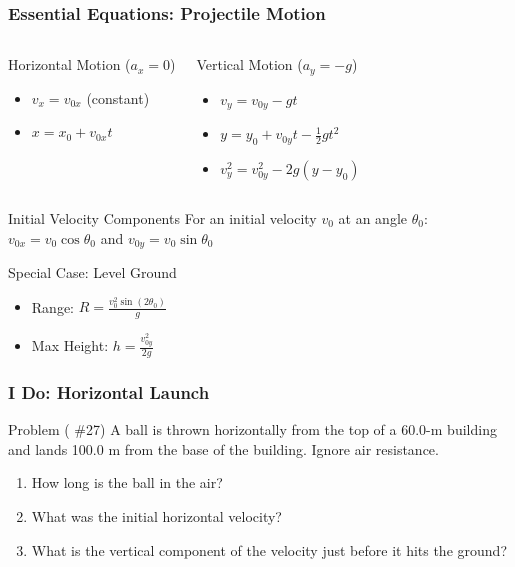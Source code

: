 \documentclass{beamer}
\begin{document}
\begin{frame}[fragile]
\frametitle{Essential Equations: Projectile Motion}
\begin{columns}
\begin{block}{Horizontal Motion ($a_x = 0$)}
\begin{itemize}
    \item $v_x = v_{0x}$ (constant)
    \item $x = x_0 + v_{0x}t$
\end{itemize}
\end{block}
\begin{block}{Vertical Motion ($a_y = -g$)}
\begin{itemize}
    \item $v_y = v_{0y} - gt$
    \item $y = y_0 + v_{0y}t - \frac{1}{2}gt^2$
    \item $v_y^2 = v_{0y}^2 - 2g(y - y_0)$
\end{itemize}
\end{block}
\end{columns}
\pause
\begin{block}{Initial Velocity Components}
For an initial velocity $v_0$ at an angle $\theta_0$:
$v_{0x} = v_0 \cos \theta_0$ \quad and \quad $v_{0y} = v_0 \sin \theta_0$
\end{block}
\pause
\begin{block}{Special Case: Level Ground}
\begin{itemize}
    \item Range: $R = \frac{v_0^2 \sin(2\theta_0)}{g}$
    \item Max Height: $h = \frac{v_{0y}^2}{2g}$
\end{itemize}
\end{block}
\end{frame}

\begin{frame}
\frametitle{I Do: Horizontal Launch}
\begin{block}{Problem ( \#27)}
A ball is thrown horizontally from the top of a 60.0-m building and lands 100.0 m from the base of the building. Ignore air resistance.
\begin{enumerate}
    \item How long is the ball in the air?
    \item What was the initial horizontal velocity?
    \item What is the vertical component of the velocity just before it hits the ground?
\end{enumerate}
\end{block}
\end{frame}
\end{document}
